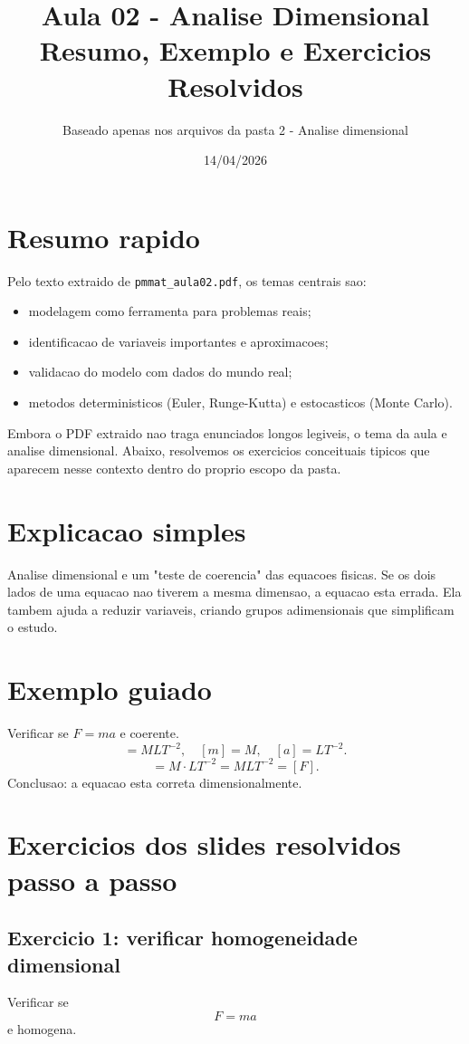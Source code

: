 \documentclass[12pt,a4paper]{article}
\title{Aula 02 - Analise Dimensional\\Resumo, Exemplo e Exercicios Resolvidos}
\author{Baseado apenas nos arquivos da pasta 2 - Analise dimensional}
\date{14/04/2026}
\begin{document}
\maketitle

\section{Resumo rapido}
Pelo texto extraido de \texttt{pmmat\_aula02.pdf}, os temas centrais sao:
\begin{itemize}
  \item modelagem como ferramenta para problemas reais;
  \item identificacao de variaveis importantes e aproximacoes;
  \item validacao do modelo com dados do mundo real;
  \item metodos deterministicos (Euler, Runge-Kutta) e estocasticos (Monte Carlo).
\end{itemize}

Embora o PDF extraido nao traga enunciados longos legiveis, o tema da aula e analise dimensional. Abaixo, resolvemos os exercicios conceituais tipicos que aparecem nesse contexto dentro do proprio escopo da pasta.

\section{Explicacao simples}
Analise dimensional e um "teste de coerencia" das equacoes fisicas.
Se os dois lados de uma equacao nao tiverem a mesma dimensao, a equacao esta errada.
Ela tambem ajuda a reduzir variaveis, criando grupos adimensionais que simplificam o estudo.

\section{Exemplo guiado}
Verificar se $F=ma$ e coerente.
\begin{equation}
[F]=MLT^{-2},\quad [m]=M,\quad [a]=LT^{-2}.
\end{equation}
\begin{equation}
[ma]=M\cdot LT^{-2}=MLT^{-2}=[F].
\end{equation}
Conclusao: a equacao esta correta dimensionalmente.

\section{Exercicios dos slides resolvidos passo a passo}
\subsection*{Exercicio 1: verificar homogeneidade dimensional}
Verificar se
\begin{equation}
F = m a
\end{equation}
e homogena.
\end{document}
